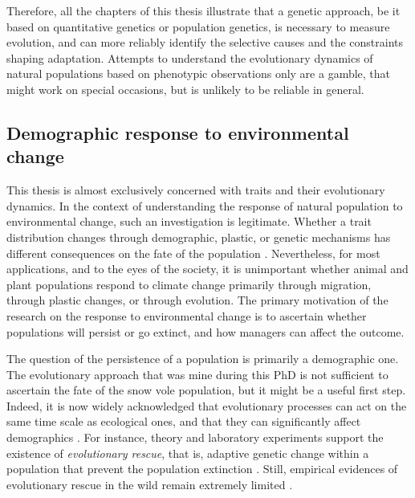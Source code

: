 Therefore, all the chapters of this thesis illustrate that a genetic approach, be it based on quantitative genetics or population genetics, is necessary to measure evolution, and can more reliably identify the selective causes and the constraints shaping adaptation. 
Attempts to understand the evolutionary dynamics of natural populations based on phenotypic observations only \parencite[e.g.][]{Smallegange2013} are a gamble, that might work on special occasions, but is unlikely to be reliable in general. 

\subsection{Demographic response to environmental change}
This thesis is almost exclusively concerned with traits and their evolutionary dynamics. 
In the context of understanding the response of natural population to environmental change, such an investigation is legitimate. Whether a trait distribution changes through demographic, plastic, or genetic mechanisms has different consequences on the fate of the population \parencite{Chevin2010}.
Nevertheless, for most applications, and to the eyes of the society, it is unimportant whether animal and plant populations respond to climate change primarily through migration, through plastic changes, or through evolution. The primary motivation of the research on the response to environmental change is to ascertain whether populations will persist or go extinct, and how managers can affect the outcome.

The question of the persistence of a population is primarily a demographic one. The evolutionary approach that was mine during this PhD is not sufficient to ascertain the fate of the snow vole population, but it might be a useful first step. Indeed, it is now widely acknowledged that evolutionary processes can act on the same time scale as ecological ones, and that they can significantly affect demographics \parencite{Hairston2005,Ellner2011, Chevin2010a, Turcotte2011}. For instance, theory and laboratory experiments support the existence of \emph{evolutionary rescue}, that is, adaptive genetic change within a population that prevent the population extinction \parencite{Gonzalez2013a, Schiffers2013a}. Still, empirical evidences of evolutionary rescue in the wild remain extremely limited \parencite{Wal2013}.

